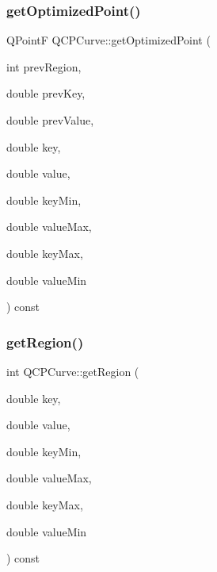 \mbox{\label{class_q_c_p_curve_a1d4530a81f718a2085df03d6a059d5d8}} 
\subsubsection{\texorpdfstring{getOptimizedPoint()}{getOptimizedPoint()}}
{\footnotesize\ttfamily Q\+PointF Q\+C\+P\+Curve\+::get\+Optimized\+Point (\begin{DoxyParamCaption}\item[{int}]{prev\+Region,  }\item[{double}]{prev\+Key,  }\item[{double}]{prev\+Value,  }\item[{double}]{key,  }\item[{double}]{value,  }\item[{double}]{key\+Min,  }\item[{double}]{value\+Max,  }\item[{double}]{key\+Max,  }\item[{double}]{value\+Min }\end{DoxyParamCaption}) const\hspace{0.3cm}{\ttfamily [protected]}}

\mbox{\label{class_q_c_p_curve_a77c89253397c4754b40d4bc8d3e789bf}} 
\subsubsection{\texorpdfstring{getRegion()}{getRegion()}}
{\footnotesize\ttfamily int Q\+C\+P\+Curve\+::get\+Region (\begin{DoxyParamCaption}\item[{double}]{key,  }\item[{double}]{value,  }\item[{double}]{key\+Min,  }\item[{double}]{value\+Max,  }\item[{double}]{key\+Max,  }\item[{double}]{value\+Min }\end{DoxyParamCaption}) const\hspace{0.3cm}{\ttfamily [protected]}}

